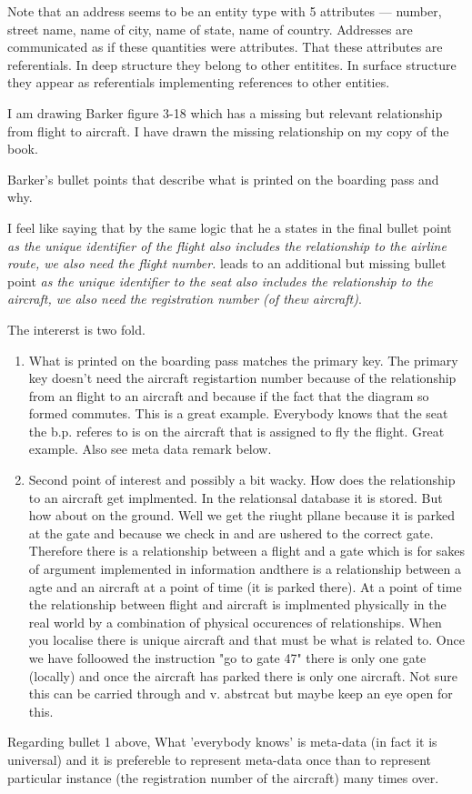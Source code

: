 \begin{noteforfuture}
Note that an address seems to be an entity type with 5 attributes ---
number, street name, name of city, name of state, name of country.
Addresses are communicated as if these quantities were attributes. That these attributes are referentials. In deep structure they belong to other entitites. In surface structure they appear as referentials implementing references to other entities.
\end{noteforfuture}

\begin{noteforfuture}
I am drawing Barker figure 3-18 which has a missing but relevant relationship from flight to aircraft.
I have drawn the missing relationship on my copy of the book.

Barker's bullet points that describe what is printed on the boarding pass and why.

I feel like saying that by the same logic that he a
states  in the final bullet point
\textit{as the unique identifier of the flight also includes the relationship to the airline route, we also need the flight number.}
leads to an additional but missing bullet point
\textit{as the unique identifier to the seat also includes the relationship to the aircraft, we also need the registration number (of thew aircraft)}.

The intererst is two fold.
\begin{enumerate}
		\item What is printed on the boarding pass matches the primary key.
		The primary key doesn't need the aircraft registartion number because of the relationship from an flight to an aircraft and because if the fact that the diagram so formed commutes. This is a great example. Everybody knows that the seat the b.p. referes to is on the aircraft that is assigned to fly the flight. Great example. Also see meta data remark below.
		\item Second point of interest and possibly a bit wacky.
		How does the relationship to an aircraft get implmented. In the relationsal database it is stored. But how about on the ground. Well we get the riught pllane because it is parked at the gate and because we check in and are ushered to the correct gate. Therefore there is a relationship between a flight and a gate which is for sakes of argument implemented in information andthere is a relationship between a agte and an aircraft at a point of time (it is parked there). At a point of time the relationship between flight and aircraft is implmented physically in the real world by a combination of physical occurences of relationships. When you localise there is unique aircraft and that must be what is related to. Once we have folloowed the instruction "go to gate 47" there is only one gate (locally) and once the aircraft has parked there is only one aircraft. Not sure this can be carried through and v. abstrcat but maybe keep an eye open for this. 
	\end{enumerate}
Regarding bullet 1 above,
	What 'everybody knows' is meta-data (in fact it is universal) and it is prefereble to represent meta-data once than to represent particular instance (the registration number of the aircraft) many times over. 



\end{noteforfuture}
